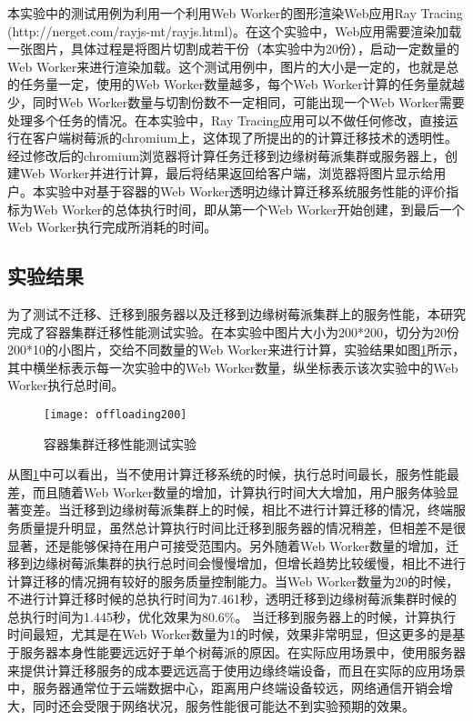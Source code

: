 本实验中的测试用例为利用一个利用Web Worker的图形渲染Web应用Ray Tracing (http://nerget.com/rayjs-mt/rayjs.html)。在这个实验中，Web应用需要渲染加载一张图片，具体过程是将图片切割成若干份（本实验中为20份），启动一定数量的Web Worker来进行渲染加载。这个测试用例中，图片的大小是一定的，也就是总的任务量一定，使用的Web Worker数量越多，每个Web Worker计算的任务量就越少，同时Web Worker数量与切割份数不一定相同，可能出现一个Web Worker需要处理多个任务的情况。在本实验中，Ray Tracing应用可以不做任何修改，直接运行在客户端树莓派的chromium上，这体现了所提出的的计算迁移技术的透明性。经过修改后的chromium浏览器将计算任务迁移到边缘树莓派集群或服务器上，创建Web Worker并进行计算，最后将结果返回给客户端，浏览器将图片显示给用户。本实验中对基于容器的Web Worker透明边缘计算迁移系统服务性能的评价指标为Web Worker的总体执行时间，即从第一个Web Worker开始创建，到最后一个Web Worker执行完成所消耗的时间。

\subsection{实验结果}

为了测试不迁移、迁移到服务器以及迁移到边缘树莓派集群上的服务性能，本研究完成了容器集群迁移性能测试实验。在本实验中图片大小为200*200，切分为20份200*10的小图片，交给不同数量的Web Worker来进行计算，实验结果如图\ref{fig:computation_offloading_result_picture_200}所示，其中横坐标表示每一次实验中的Web Worker数量，纵坐标表示该次实验中的Web Worker执行总时间。

\begin{figure}[!htbp]
    \centering
    \texttt{[image: offloading200]}
    \caption{容器集群迁移性能测试实验}
    \label{fig:computation_offloading_result_picture_200}
\end{figure}

从图\ref{fig:computation_offloading_result_picture_200}中可以看出，当不使用计算迁移系统的时候，执行总时间最长，服务性能最差，而且随着Web Worker数量的增加，计算执行时间大大增加，用户服务体验显著变差。当迁移到边缘树莓派集群上的时候，相比不进行计算迁移的情况，终端服务质量提升明显，虽然总计算执行时间比迁移到服务器的情况稍差，但相差不是很显著，还是能够保持在用户可接受范围内。另外随着Web Worker数量的增加，迁移到边缘树莓派集群的执行总时间会慢慢增加，但增长趋势比较缓慢，相比不进行计算迁移的情况拥有较好的服务质量控制能力。当Web Worker数量为20的时候，不进行计算迁移时候的总执行时间为7.461秒，透明迁移到边缘树莓派集群时候的总执行时间为1.445秒，优化效果为80.6\%。
当迁移到服务器上的时候，计算执行时间最短，尤其是在Web Worker数量为1的时候，效果非常明显，但这更多的是基于服务器本身性能要远远好于单个树莓派的原因。在实际应用场景中，使用服务器来提供计算迁移服务的成本要远远高于使用边缘终端设备，而且在实际的应用场景中，服务器通常位于云端数据中心，距离用户终端设备较远，网络通信开销会增大，同时还会受限于网络状况，服务性能很可能达不到实验预期的效果。

